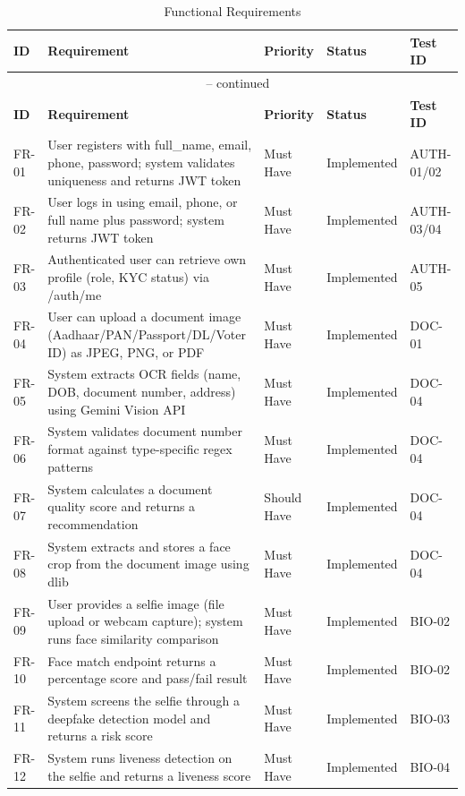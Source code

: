 \documentclass[12pt,a4paper]{report}
\begin{document}
\begin{longtable}{@{}p{1.5cm}p{5cm}p{3cm}p{2.5cm}p{2.5cm}@{}}
\caption{Functional Requirements} \\
\toprule
\textbf{ID} & \textbf{Requirement} & \textbf{Priority} & \textbf{Status} & \textbf{Test ID} \\
\midrule
\endfirsthead
\multicolumn{5}{c}{\tablename\ \thetable{} -- continued} \\
\toprule
\textbf{ID} & \textbf{Requirement} & \textbf{Priority} & \textbf{Status} & \textbf{Test ID} \\
\midrule
\endhead
FR-01 & User registers with full\_name, email, phone, password; system validates uniqueness and returns JWT token & Must Have & Implemented & AUTH-01/02 \\
FR-02 & User logs in using email, phone, or full name plus password; system returns JWT token & Must Have & Implemented & AUTH-03/04 \\
FR-03 & Authenticated user can retrieve own profile (role, KYC status) via /auth/me & Must Have & Implemented & AUTH-05 \\
FR-04 & User can upload a document image (Aadhaar/PAN/Passport/DL/Voter ID) as JPEG, PNG, or PDF & Must Have & Implemented & DOC-01 \\
FR-05 & System extracts OCR fields (name, DOB, document number, address) using Gemini Vision API & Must Have & Implemented & DOC-04 \\
FR-06 & System validates document number format against type-specific regex patterns & Must Have & Implemented & DOC-04 \\
FR-07 & System calculates a document quality score and returns a recommendation & Should Have & Implemented & DOC-04 \\
FR-08 & System extracts and stores a face crop from the document image using dlib & Must Have & Implemented & DOC-04 \\
FR-09 & User provides a selfie image (file upload or webcam capture); system runs face similarity comparison & Must Have & Implemented & BIO-02 \\
FR-10 & Face match endpoint returns a percentage score and pass/fail result & Must Have & Implemented & BIO-02 \\
FR-11 & System screens the selfie through a deepfake detection model and returns a risk score & Must Have & Implemented & BIO-03 \\
FR-12 & System runs liveness detection on the selfie and returns a liveness score & Must Have & Implemented & BIO-04 \\

\end{longtable}
\end{document}
